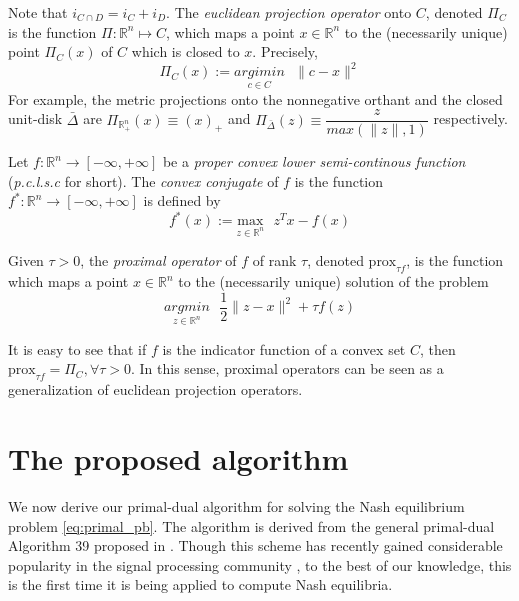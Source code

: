 \documentclass{article} %
\begin{document}
Note that $i_{C \cap D} = i_C + i_D$. The \textit{euclidean projection operator} onto $C$, denoted $\Pi_C$ is the function
$\Pi: \mathbb{R}^n \mapsto C$, which maps a point $x \in \mathbb{R}^n$ to the (necessarily unique) point $\Pi_C(x)$ of $C$ which is closed to $x$. Precisely,
\begin{equation}
  \Pi_C(x) := \underset{c \in C}{argimin}\text{ }\|c - x\|^2
\end{equation}
For example, the metric projections onto the nonnegative orthant and the closed unit-disk $\bar{\Delta}$
are $\Pi_{\mathbb{R}^n_+}(x) \equiv (x)_+$ and $\Pi_{\bar{\Delta}}(z) \equiv \dfrac{z}{max(\|z\|, 1)}$ respectively.

Let $f : \mathbb{R}^n \rightarrow [-\infty, +\infty]$ be a \textit{proper convex lower semi-continous function}
(\textit{p.c.l.s.c} for short). The \textit{convex conjugate} of $f$ is the function $f^*: \mathbb{R}^n \rightarrow [-\infty, +\infty]$ is defined by
\begin{equation}
  f^*(x) := \underset{z \in \mathbb{R}^n}{\text{max}}\text{ }z^Tx - f(x)
\end{equation}

Given $\tau > 0$, the \textit{proximal operator} of $f$ of rank
$\tau$, denoted $\text{prox}_{\tau f}$, is the function which maps a point $x \in \mathbb{R}^n$ to the (necessarily
unique) solution of the problem
\begin{equation}
  \underset{z \in \mathbb{R}^n}{argmin}\text{ }\frac{1}{2}\|z - x\|^2 + \tau f(z)
\end{equation}

It is easy to see that if $f$ is the indicator function of a convex set $C$, then $\text{prox}_{\tau f} = \Pi_C, \forall \tau > 0$. In this sense, proximal operators can be seen
as a generalization of euclidean projection operators.

\section{The proposed algorithm}
\label{sec:algo}
We now derive our primal-dual algorithm for solving the Nash equilibrium problem \eqref{eq:primal_pb}. The algorithm is derived from the general primal-dual Algorithm 39 proposed in \cite{chambolle2010}. Though this scheme has recently gained considerable popularity in the signal processing community
, to the best of our knowledge, this is the first time it is being applied to compute Nash equilibria.
\end{document}
